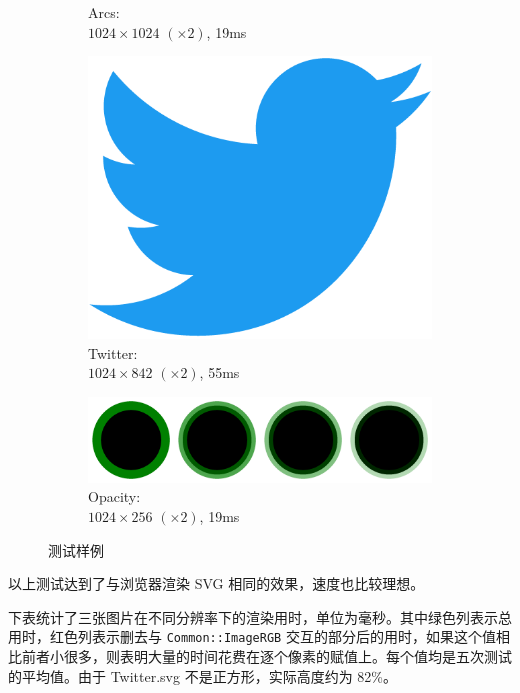 \documentclass[UTF8]{ctexart}
\begin{document}
\begin{figure}[H]
\begin{subfigure}[b]{0.3\textwidth}
        \caption{Arcs: \\$1024 \times 1024$ $(\times 2)$, 19ms}
    \end{subfigure}
    \hfill
    \begin{subfigure}[b]{0.3\textwidth}
        \centering
        \includegraphics[width=\textwidth]{images/Twitter-1024x842-x2-55ms.png}
        \caption{Twitter: \\$1024 \times 842$ $(\times 2)$, 55ms}
    \end{subfigure}
    \par\bigskip
    \begin{subfigure}[b]{0.6\textwidth}
        \centering
        \includegraphics[width=\textwidth]{images/Opacity-1024x256-x2-19ms.png}
        \caption{Opacity: \\$1024 \times 256$ $(\times 2)$, 19ms}
    \end{subfigure}
    \caption{测试样例}
\end{figure}

以上测试达到了与浏览器渲染 SVG 相同的效果，速度也比较理想。

下表统计了三张图片在不同分辨率下的渲染用时，单位为毫秒。其中\colorbox{color1}{绿色列}表示总用时，\colorbox{color2}{红色列}表示删去与 \texttt{Common::ImageRGB} 交互的部分后的用时，如果这个值相比前者小很多，则表明大量的时间花费在逐个像素的赋值上。每个值均是五次测试的平均值。由于 Twitter.svg 不是正方形，实际高度约为 82\%。
\end{document}
